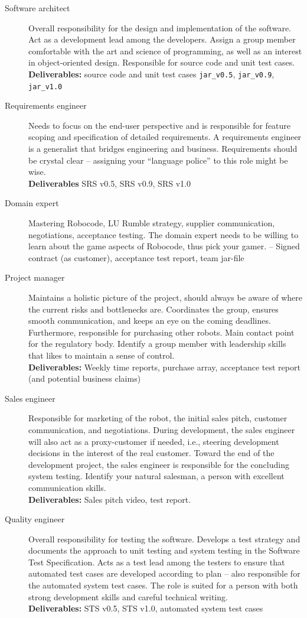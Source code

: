 \documentclass{scrreprt}
\begin{document}
\begin{description}
\item[Software architect] Overall responsibility for the design and implementation of the software. Act as a development lead among the developers. Assign a group member comfortable with the art and science of programming, as well as an interest in object-oriented design. Responsible for source code and unit test cases. \\ \textbf{Deliverables:} source code and unit test cases \texttt{jar_v0.5}, \texttt{jar_v0.9}, \texttt{jar_v1.0}
\item[Requirements engineer] Needs to focus on the end-user perspective and is responsible for feature scoping and specification of detailed requirements. A requirements engineer is a generalist that bridges engineering and business. Requirements should be crystal clear -- assigning your ``language police'' to this role might be wise.\\
\textbf{Deliverables} SRS v0.5, SRS v0.9, SRS v1.0
\item[Domain expert] Mastering Robocode, LU Rumble strategy, supplier communication, negotiations, acceptance testing. The domain expert needs to be willing to learn about the game aspects of Robocode, thus pick your gamer. -- Signed contract (as customer), acceptance test report, team jar-file
\item[Project manager] Maintains a holistic picture of the project, should always be aware of where the current risks and bottlenecks are. Coordinates the group, ensures smooth communication, and keeps an eye on the coming deadlines. Furthermore, responsible for purchasing other robots. Main contact point for the regulatory body. Identify a group member with leadership skills that likes to maintain a sense of control.\\
\textbf{Deliverables: } Weekly time reports, purchase array, acceptance test report (and potential business claims)
\item[Sales engineer] Responsible for marketing of the robot, the initial sales pitch, customer communication, and negotiations. During development, the sales engineer will also act as a proxy-customer if needed, i.e., steering development decisions in the interest of the real customer. Toward the end of the development project, the sales engineer is responsible for the concluding system testing. Identify your natural salesman, a person with excellent communication skills.\\
\textbf{Deliverables: } Sales pitch video, test report. 
\item[Quality engineer] Overall responsibility for testing the software. Develops a test strategy and documents the approach to unit testing and system testing in the Software Test Specification. Acts as a test lead among the testers to ensure that automated test cases are developed according to plan -- also responsible for the automated system test cases. The role is suited for a person with both strong development skills and careful technical writing.\\
\textbf{Deliverables: } STS v0.5, STS v1.0, automated system test cases
\end{description}
\end{document}
